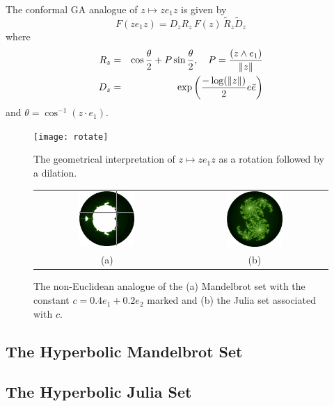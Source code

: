 \begin{definition}
The conformal GA analogue of $z \mapsto ze_1z$ is given by
\[
F(ze_1z) = D_z R_z\,F(z)\,\tilde{R}_z \tilde{D}_z
\]
where
\begin{eqnarray*}
R_z & = & \cos \frac{\theta}{2} + P \sin \frac{\theta}{2},
    \quad
P = \frac{(z \wedge e_1)}{\left\Vert z \right\Vert} \\
D_z & = & \exp\left( \frac{-\log(\left\Vert z \right\Vert)}{2} e\bar{e} \right)
\end{eqnarray*}
and $\theta = \cos^{-1}(z \cdot e_1)$.
\end{definition}

\begin{figure}
\centering
\texttt{[image: rotate]}
\caption{\label{fig:rotate}%
  The geometrical interpretation of $z \mapsto ze_1z$ as a rotation followed by a dilation.
}
\end{figure}


\begin{figure}
\centering
\begin{tabular}{c@{$\quad$}c}
\includegraphics[width=0.4\textwidth]{hyp_mandel_julia_pos} 
 & \includegraphics[width=0.4\textwidth]{julia_hyp} \\
                          (a) & (b)
\end{tabular}
\caption{\label{fig:noneuclidean_sets}The non-Euclidean analogue of the (a) Mandelbrot set with
  the constant $c = 0.4e_1 + 0.2e_2$ marked and (b) the Julia
  set associated with $c$.}
\end{figure}

\subsection{The Hyperbolic Mandelbrot Set}

\subsection{The Hyperbolic Julia Set}
